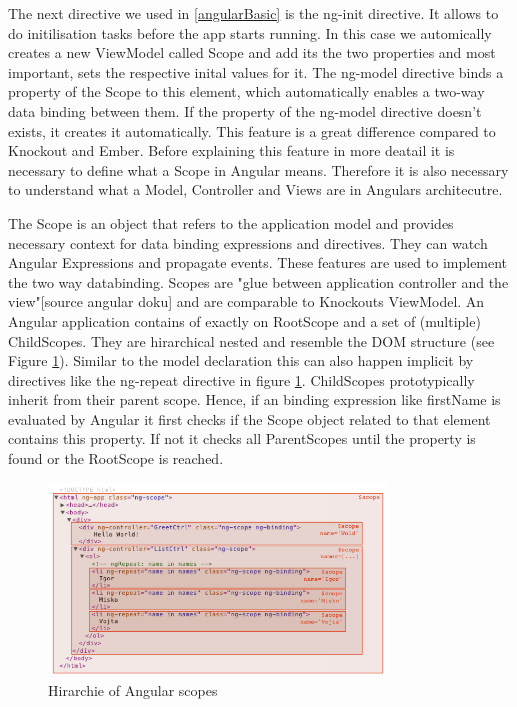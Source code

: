 The next directive we used in \ref{angularBasic} is the ng-init directive. It allows to do initilisation tasks before the app starts running. In this case we automically creates a new ViewModel called Scope and add its the two properties and most important, sets the respective inital values for it. The ng-model directive binds a property of the Scope to this element, which automatically enables a two-way data binding between them. If the property of the ng-model directive doesn't exists, it creates it automatically. This feature is a great difference compared to Knockout and Ember. Before explaining this feature in more deatail it is necessary to define what a Scope in Angular means. Therefore it is also necessary to understand what a Model, Controller and Views are in Angulars architecutre.


The Scope is an object that refers to the application model and provides necessary context for data binding expressions and directives. They can watch Angular Expressions and propagate events. These features are used to implement the two way databinding. Scopes are "glue between application controller and the view"[source angular doku] and are comparable to Knockouts ViewModel. An Angular application contains of exactly on RootScope and a set of (multiple)  ChildScopes. They are hirarchical nested and resemble the DOM structure (see Figure \ref{fig:angular_scopes}). Similar to the model declaration this can also happen implicit by directives like the ng-repeat directive in figure \ref{fig:angular_scopes}. ChildScopes prototypically inherit from their parent scope. Hence, if an binding expression like {{firstName}} is evaluated by Angular it first checks if the Scope object related to that element contains this property. If not it checks all ParentScopes until the property is found or the RootScope is reached.

\begin{figure}
	\centering	
	\includegraphics[width=0.8\textwidth]{./img/angular_scopes.png}
	\caption{Hirarchie of Angular scopes}
	\label{fig:angular_scopes}
\end{figure} 

